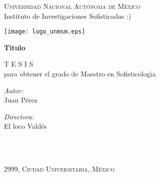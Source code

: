 \begin{titlepage}
\setlength{\parindent}{0pt} \setlength{\parskip}{0pt}

\begin{center}

\textsc{\large Universidad Nacional Aut\'onoma de M\'exico}\\[0.2cm]
{\large Instituto de Investigaciones Sofisticadas :)}\\[1cm]
\end{center}

\begin{center}

\texttt{[image: logo\_unmsm.eps]}
\end{center}

\begin{center}

\vfill
{\Large \bfseries Titulo}\\[0.4cm]
\end{center}
 \HRule
\begin{center}
{\huge T E S I S}\\[0.4cm]
{\Large para obtener el grado de Maestro en Sofisticolog\'{\i}a} \\[0.4cm]
\end{center}
\begin{minipage}{0.5\textwidth}
\begin{center}
\emph{Autor:}\\
Juan P\'erez
\end{center}
\end{minipage}
\begin{minipage}{0.5\textwidth}
\begin{center}
\emph{Directora:} \\
El loco Vald\'es
\end{center}
\end{minipage}
\\[0.4cm]
\HRule {}
\\[0.8cm]
\begin{center}
\large \textsc{2999, Ciudad Universitaria, M\'exico}
\end{center}
\end{titlepage}